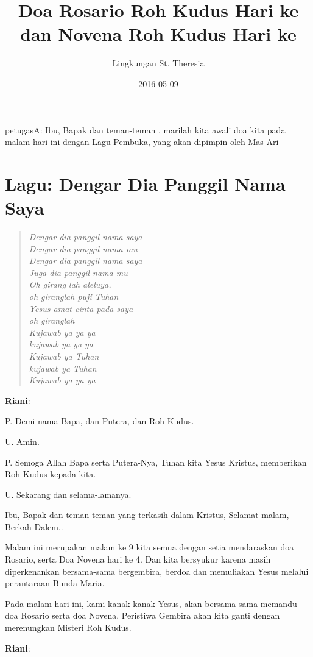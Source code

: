 \documentclass[12pt]{article}
\title{Doa Rosario Roh Kudus Hari ke \rosario{} dan Novena Roh Kudus Hari ke \novena{}}
\author{Lingkungan St. Theresia}
\date{2016-05-09}
\def\petugasA{\textbf{Riani}}
\begin{document}
	
 \maketitle
\onehalfspacing
petugasA: Ibu, Bapak dan teman-teman , marilah kita awali doa kita pada
malam hari ini dengan Lagu Pembuka, yang akan dipimpin oleh Mas Ari

\section{Lagu: Dengar Dia Panggil
Nama Saya }
\begin{quote}
\textit{
Dengar dia panggil nama saya\\
Dengar dia panggil nama mu\\ 
Dengar dia panggil nama saya\\
Juga dia panggil nama mu\\ 
Oh girang lah aleluya,  \\
oh giranglah puji Tuhan\\ 
Yesus amat cinta pada saya\\ 
oh giranglah\\  
Kujawab ya ya ya \\
kujawab ya ya ya \\
Kujawab ya Tuhan \\
kujawab ya Tuhan \\ 
Kujawab ya ya ya
}
\end{quote}

\petugasA: 

P. Demi nama Bapa, dan Putera, dan Roh Kudus.

U. Amin.

P. Semoga Allah Bapa serta Putera-Nya, Tuhan kita Yesus Kristus,
memberikan Roh Kudus kepada kita.

U. Sekarang dan selama-lamanya.

Ibu, Bapak dan teman-teman yang terkasih dalam Kristus, Selamat malam,
Berkah Dalem..

Malam ini merupakan malam ke 9 kita semua dengan setia mendaraskan doa
Rosario, serta Doa Novena hari ke 4. Dan kita bersyukur karena masih
diperkenankan bersama-sama bergembira, berdoa dan memuliakan Yesus
melalui perantaraan Bunda Maria. 

Pada malam hari ini, kami kanak-kanak Yesus, akan bersama-sama memandu
doa Rosario serta doa Novena. Peristiwa Gembira akan kita ganti dengan
merenungkan Misteri Roh Kudus.  

\petugasA: 
\end{document}
